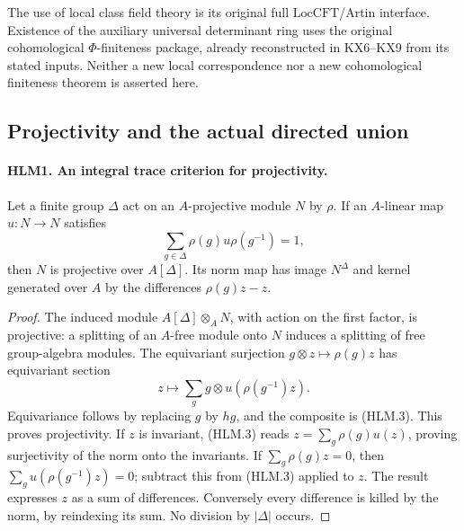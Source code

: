 \documentclass[11pt,a4paper]{article}
\numberwithin{equation}{section}
\theoremstyle{remark}\newtheorem{remark}[theorem]{Remark}
\begin{document}
The use of local class field theory is its original full
\(\mathrm{LocCFT}\)/Artin interface.  Existence of the auxiliary
universal determinant ring uses the original cohomological
\(\Phi\)-finiteness package, already reconstructed in KX6--KX9
from its stated inputs.  Neither a new local correspondence nor a
new cohomological finiteness theorem is asserted here.

\subsection{Projectivity and the actual directed union}

\paragraph{HLM1. An integral trace criterion for projectivity.}
\label{claim:HLM1}
Let a finite group \(\Delta\) act on an \(A\)-projective module
\(N\) by \(\rho\).  If an \(A\)-linear map \(u:N\to N\)
satisfies
\[
             \sum_{g\in\Delta}\rho(g)u\rho(g^{-1})=1,
 \tag{HLM.3}
\]
then \(N\) is projective over \(A[\Delta]\).
Its norm map has image \(N^\Delta\) and kernel generated over
\(A\) by the differences \(\rho(g)z-z\).
\begin{proof}
The induced module \(A[\Delta]\otimes_A N\), with action on
the first factor, is projective: a splitting of an \(A\)-free
module onto \(N\) induces a splitting of free group-algebra
modules.  The equivariant surjection
\(g\otimes z\mapsto\rho(g)z\) has equivariant section
\[
               z\longmapsto
                 \sum_g g\otimes u(\rho(g^{-1})z).
\]
Equivariance follows by replacing \(g\) by \(hg\), and the
composite is (HLM.3).  This proves projectivity.
If \(z\) is invariant, (HLM.3) reads
\(z=\sum_g\rho(g)u(z)\), proving surjectivity of the norm
onto the invariants.  If \(\sum_g\rho(g)z=0\), then
\(\sum_g u(\rho(g^{-1})z)=0\); subtract this from (HLM.3)
applied to \(z\).  The result expresses \(z\) as a sum of
differences.  Conversely every difference is killed by the norm,
by reindexing its sum.  No division by \(|\Delta|\) occurs.
\end{proof}

\end{document}
